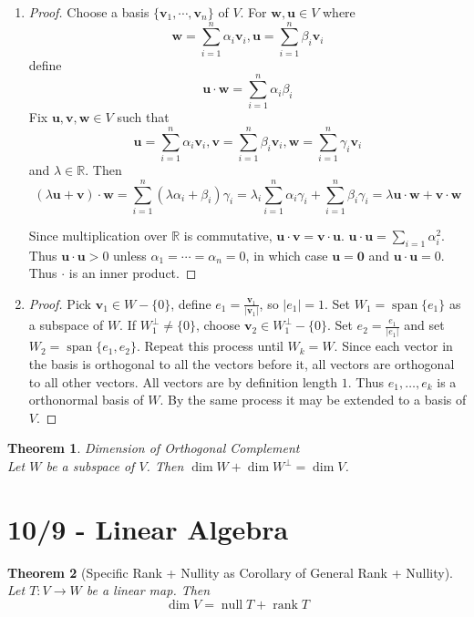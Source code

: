\documentclass[12pt]{article}
\newtheorem{thm}{Theorem}[section] %
\theoremstyle{plain}
\newcommand{\R}{\mathbb{R}}
\DeclareMathOperator{\spn}{span}
\DeclareMathOperator{\nul}{null}
\DeclareMathOperator{\rank}{rank}
\newcommand{\vv}{\mathbf{v}}
\newcommand{\vu}{\mathbf{u}}
\newcommand{\vw}{\mathbf{w}}
\newcommand{\vzero}{\mathbf{0}}
\begin{document}
    \begin{enumerate}
        \item \begin{proof}
            Choose a basis $\{\vv_1, \cdots, \vv_n\}$ of $V$. For $\vw, \vu \in V$ where $$\vw = \sum_{i = 1}^n \alpha_i \vv_i, \vu = \sum_{i=1}^n \beta_i \vv_i$$define $$\vu \cdot \vw = \sum_{i = 1}^n \alpha_i\beta_i$$Fix $\vu, \vv, \vw \in V$ such that$$\vu = \sum_{i=1}^n \alpha_i \vv_i, \vv=\sum_{i=1}^n \beta_i \vv_i, \vw=\sum_{i=1}^n \gamma_i \vv_i$$and $\lambda \in \R$. Then $$(\lambda \vu + \vv) \cdot \vw = \sum_{i = 1}^n (\lambda \alpha_i + \beta_i)\gamma_i = \lambda_i \sum_{i = 1}^n \alpha_i \gamma_i + \sum_{i = 1}^n \beta_i \gamma_i = \lambda \vu \cdot \vw + \vv \cdot \vw$$

            Since multiplication over $\R$ is commutative, $\vu \cdot \vv = \vv \cdot \vu$. $\vu \cdot \vu = \sum_{i = 1} \alpha_i^2$. Thus $\vu \cdot \vu > 0$ unless $\alpha_1 = \cdots = \alpha_n = 0$, in which case $\vu = \vzero$ and $\vu \cdot \vu = 0$. Thus $\cdot$ is an inner product.
        \end{proof}
        \item \begin{proof}
            Pick $\vv_1 \in W - \{0\}$, define $e_1 = \frac{\vv_1}{|\vv_1|}$, so $|e_1| = 1$. Set $W_1 = \spn \{e_1\}$ as a subspace of $W$. If $W_1^{\perp} \neq \{0\}$, choose $\vv_2 \in W_1^{\perp} - \{0\}$. Set $e_2 = \frac{e_1}{|e_1|}$ and set $W_2 = \spn \{e_1, e_2\}$. Repeat this process until $W_k = W$. Since each vector in the basis is orthogonal to all the vectors before it, all vectors are orthogonal to all other vectors. All vectors are by definition length $1$. Thus $e_1, \dots, e_k$ is a orthonormal basis of $W$. By the same process it may be extended to a basis of $V$.
        \end{proof}
    \end{enumerate}

    \begin{thm}{Dimension of Orthogonal Complement}
        ~\\Let $W$ be a subspace of $V$. Then $\dim W + \dim W^{\perp} = \dim V$.
    \end{thm}

    \section[d4]{10/9 - Linear Algebra}
    \begin{thm}[Specific Rank + Nullity as Corollary of General Rank + Nullity]
        ~\\Let $T: V \to W$ be a linear map. Then
        $$\dim V = \nul T + \rank T$$
    \end{thm}
\end{document}
